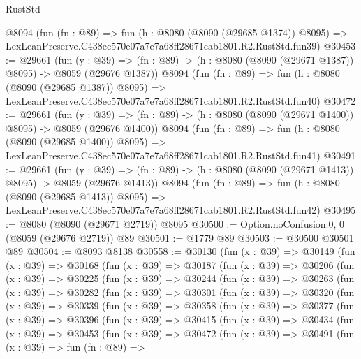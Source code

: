 \begin{lexlean}{RustStd}
\begin{coremodule}
    @8094
    (fun (fn : @89) =>
    fun (h : @8080 (@8090 (@29685 @1374)) @8095) =>
    LexLeanPreserve.C438ec570e07a7e7a68ff28671cab1801.R2.RustStd.fun39)
@30453 := @29661
    (fun (y : @39) =>
    (fn : @89) -> (h : @8080 (@8090 (@29671 @1387)) @8095) -> @8059 (@29676 @1387))
    @8094
    (fun (fn : @89) =>
    fun (h : @8080 (@8090 (@29685 @1387)) @8095) =>
    LexLeanPreserve.C438ec570e07a7e7a68ff28671cab1801.R2.RustStd.fun40)
@30472 := @29661
    (fun (y : @39) =>
    (fn : @89) -> (h : @8080 (@8090 (@29671 @1400)) @8095) -> @8059 (@29676 @1400))
    @8094
    (fun (fn : @89) =>
    fun (h : @8080 (@8090 (@29685 @1400)) @8095) =>
    LexLeanPreserve.C438ec570e07a7e7a68ff28671cab1801.R2.RustStd.fun41)
@30491 := @29661
    (fun (y : @39) =>
    (fn : @89) -> (h : @8080 (@8090 (@29671 @1413)) @8095) -> @8059 (@29676 @1413))
    @8094
    (fun (fn : @89) =>
    fun (h : @8080 (@8090 (@29685 @1413)) @8095) =>
    LexLeanPreserve.C438ec570e07a7e7a68ff28671cab1801.R2.RustStd.fun42)
@30495 := @8080 (@8090 (@29671 @2719)) @8095
@30500 := Option.noConfusion.{0, 0} (@8059 (@29676 @2719)) @89
@30501 := @1779 @89
@30503 := @30500 @30501 @89
@30504 := @8093 @8138
@30558 := @30130
    (fun (x : @39) =>
    @30149
      (fun (x : @39) =>
      @30168
        (fun (x : @39) =>
        @30187
          (fun (x : @39) =>
          @30206
            (fun (x : @39) =>
            @30225
              (fun (x : @39) =>
              @30244
                (fun (x : @39) =>
                @30263
                  (fun (x : @39) =>
                  @30282
                    (fun (x : @39) =>
                    @30301
                      (fun (x : @39) =>
                      @30320
                        (fun (x : @39) =>
                        @30339
                          (fun (x : @39) =>
                          @30358
                            (fun (x : @39) =>
                            @30377
                              (fun (x : @39) =>
                              @30396
                                (fun (x : @39) =>
                                @30415
                                  (fun (x : @39) =>
                                  @30434
                                    (fun (x : @39) =>
                                    @30453
                                      (fun (x : @39) =>
                                      @30472
                                        (fun (x : @39) =>
                                        @30491
                                          (fun (x : @39) =>
                                          fun (fn : @89) =>

\end{coremodule}
\end{lexlean}
